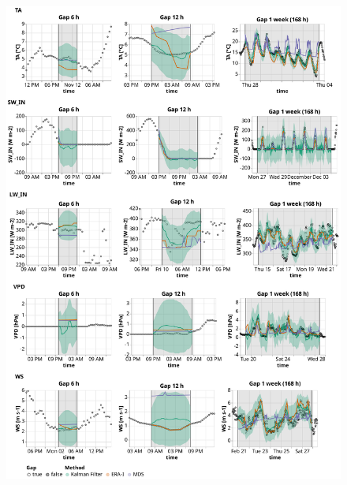 \documentclass{article}
\newcommand{\imgwidth}{6in}
\begin{document}
\begin{figure}
\centerline{\includegraphics[width=\imgwidth]{timeseries_1_1}}
\caption{}
\label{fig:ts_1-1}
\end{figure}
\restoregeometry
\end{document}
